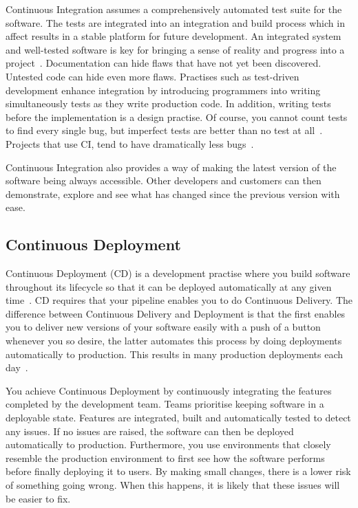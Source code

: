 \documentclass[english]{tktltiki2}
\begin{document}
Continuous Integration assumes a comprehensively automated test suite for the software. The tests are integrated into an integration and build process which in affect results in a stable platform for future development. An integrated system and well-tested software is key for bringing a sense of reality and progress into a project~\cite{Fow05}. Documentation can hide flaws that have not yet been discovered. Untested code can hide even more flaws. Practises such as test-driven development enhance integration by introducing programmers into writing simultaneously tests as they write production code. In addition, writing tests before the implementation is a design practise. Of course, you cannot count tests to find every single bug, but imperfect tests are better than no test at all~\cite{Fow06}. Projects that use CI, tend to have dramatically less bugs~\cite{Fow06}.

Continuous Integration also provides a way of making the latest version of the software being always accessible. Other developers and customers can then demonstrate, explore and see what has changed since the previous version with ease.

\subsection{Continuous Deployment}

Continuous Deployment (CD) is a development practise where you build software throughout its lifecycle so that it can be deployed automatically at any given time~\cite{Fow13a}. CD requires that your pipeline enables you to do Continuous Delivery. The difference between Continuous Delivery and Deployment is that the first enables you to deliver new versions of your software easily with a push of a button whenever you so desire, the latter automates this process by doing deployments automatically to production. This results in many production deployments each day~\cite{OR11, Sny13, Rub14}.

You achieve Continuous Deployment by continuously integrating the features completed by the development team. Teams prioritise keeping software in a deployable state. Features are integrated, built and automatically tested to detect any issues. If no issues are raised, the software can then be deployed automatically to production. Furthermore, you use environments that closely resemble the production environment to first see how the software performs before finally deploying it to users. By making small changes, there is a lower risk of something going wrong. When this happens, it is likely that these issues will be easier to fix.
\end{document}
